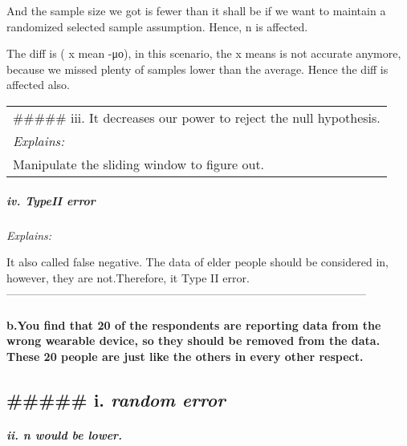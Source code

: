 \documentclass[
]{article}
\begin{document}
And the sample size we got is fewer than it shall be if we want to
maintain a randomized selected sample assumption. Hence, n is affected.

The diff is ( x mean -μο), in this scenario, the x means is not accurate
anymore, because we missed plenty of samples lower than the average.
Hence the diff is affected also.

\begin{longtable}[]{@{}
  >{\raggedright\arraybackslash}p{}@{}}
\toprule
\endhead
\#\#\#\#\# iii. It decreases our power to reject the null hypothesis. \\
\emph{Explains:} \\
Manipulate the sliding window to figure out. \\
\bottomrule
\end{longtable}

\hypertarget{iv.-typeii-error}{%
\subparagraph{iv. TypeII error}\label{iv.-typeii-error}}

\emph{Explains:}

It also called false negative. The data of elder people should be
considered in, however, they are not.Therefore, it Type II error.
------------------------------------------------------------------------------------------------

\hypertarget{b.you-find-that-20-of-the-respondents-are-reporting-data-from-the-wrong-wearable-device-so-they-should-be-removed-from-the-data.-these-20-people-are-just-like-the-others-in-every-other-respect.}{%
\paragraph{b.You find that 20 of the respondents are reporting data from
the wrong wearable device, so they should be removed from the data.
These 20 people are just like the others in every other
respect.}\label{b.you-find-that-20-of-the-respondents-are-reporting-data-from-the-wrong-wearable-device-so-they-should-be-removed-from-the-data.-these-20-people-are-just-like-the-others-in-every-other-respect.}}

\hypertarget{i.-random-error}{%
\subsection{\texorpdfstring{\#\#\#\#\# i. \emph{random
error}}{\#\#\#\#\# i. random error}}\label{i.-random-error}}

\hypertarget{ii.-n-would-be-lower.}{%
\subparagraph{\texorpdfstring{ii. \emph{n would be lower.
}}{ii. n would be lower. }}\label{ii.-n-would-be-lower.}}
\end{document}
